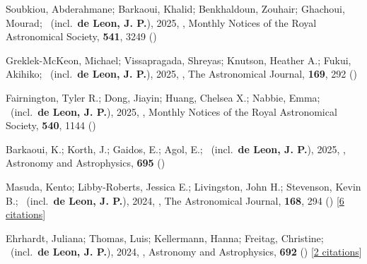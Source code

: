\item[{\color{numcolor}\scriptsize80}] Soubkiou, Abderahmane; Barkaoui, Khalid; Benkhaldoun, Zouhair; Ghachoui, Mourad; \etal\ (incl.\ \textbf{de Leon, J. P.}), 2025, , Monthly Notices of the Royal Astronomical Society, \textbf{541}, 3249 ()

\item[{\color{numcolor}\scriptsize79}] Greklek-McKeon, Michael; Vissapragada, Shreyas; Knutson, Heather A.; Fukui, Akihiko; \etal\ (incl.\ \textbf{de Leon, J. P.}), 2025, , The Astronomical Journal, \textbf{169}, 292 ()

\item[{\color{numcolor}\scriptsize78}] Fairnington, Tyler R.; Dong, Jiayin; Huang, Chelsea X.; Nabbie, Emma; \etal\ (incl.\ \textbf{de Leon, J. P.}), 2025, , Monthly Notices of the Royal Astronomical Society, \textbf{540}, 1144 ()

\item[{\color{numcolor}\scriptsize77}] Barkaoui, K.; Korth, J.; Gaidos, E.; Agol, E.; \etal\ (incl.\ \textbf{de Leon, J. P.}), 2025, , Astronomy and Astrophysics, \textbf{695} ()

\item[{\color{numcolor}\scriptsize76}] Masuda, Kento; Libby-Roberts, Jessica E.; Livingston, John H.; Stevenson, Kevin B.; \etal\ (incl.\ \textbf{de Leon, J. P.}), 2024, , The Astronomical Journal, \textbf{168}, 294 () [\href{https://ui.adsabs.harvard.edu/abs/2024AJ....168..294M}{6 citations}]

\item[{\color{numcolor}\scriptsize75}] Ehrhardt, Juliana; Thomas, Luis; Kellermann, Hanna; Freitag, Christine; \etal\ (incl.\ \textbf{de Leon, J. P.}), 2024, , Astronomy and Astrophysics, \textbf{692} () [\href{https://ui.adsabs.harvard.edu/abs/2024A&A...692A.220E}{2 citations}]

